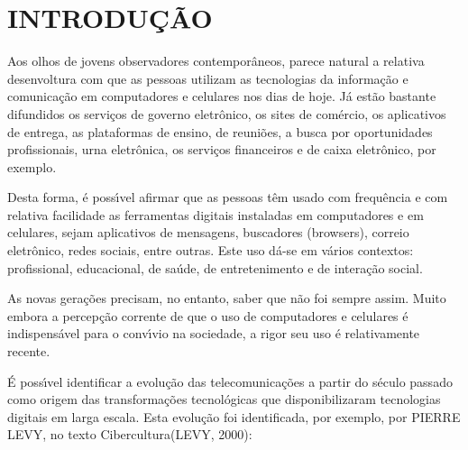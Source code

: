 \documentclass[
12pt,		%
openright,	%
twoside,  %
a4paper,			%
chapter=TITLE,		%
english,			%
french,				%
spanish,			%
brazil				%
]{USPSC-classe/USPSC}
\begin{document}
\chapter[INTRODU\c{C}\~AO]{INTRODU\c{C}\~AO}\label{INTRODU\c{C}\~AO}
Aos olhos de jovens observadores contempor\^aneos, parece natural a relativa desenvoltura com que as pessoas utilizam  as tecnologias da informa\c{c}\~ao e comunica\c{c}\~ao em computadores e celulares nos dias de hoje. J\'a est\~ao bastante difundidos os servi\c{c}os de governo eletr\^onico, os sites de com\'ercio, os  aplicativos de entrega, as plataformas de ensino, de reuni\~oes, a busca por oportunidades profissionais, urna eletr\^onica, os servi\c{c}os financeiros e de caixa eletr\^onico, por exemplo.




Desta forma, \'e poss\'{\i}vel afirmar que as pessoas t\^em usado com frequ\^encia e com relativa facilidade as ferramentas digitais instaladas em computadores e em celulares, sejam aplicativos de mensagens, buscadores (browsers), correio eletr\^onico, redes sociais, entre outras. Este uso d\'a-se em v\'arios contextos: profissional, educacional, de sa\'ude,  de entretenimento e de intera\c{c}\~ao social.




As novas gera\c{c}\~oes precisam, no entanto, saber que n\~ao foi sempre assim. Muito embora a percep\c{c}\~ao corrente de que o uso de computadores e celulares \'e indispens\'avel para o conv\'{\i}vio na sociedade, a rigor seu uso \'e relativamente recente.




\'E poss\'{\i}vel identificar a evolu\c{c}\~ao das telecomunica\c{c}\~oes a partir do s\'eculo passado como origem das transforma\c{c}\~oes tecnol\'ogicas que disponibilizaram tecnologias digitais em larga escala. Esta evolu\c{c}\~ao foi identificada, por exemplo, por PIERRE LEVY, no texto \textquotedbl Cibercultura\textquotedbl  (LEVY, 2000):





\noindent\begin{center}\mbox{\centering{}}\end{center}
\end{document}
